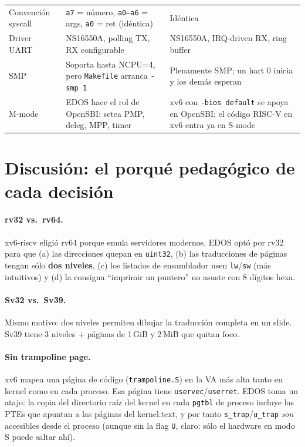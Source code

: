 \documentclass[11pt,a4paper]{article}
\begin{document}
\begin{center}
\begin{longtable}{@{}p{3.5cm}p{6cm}p{6cm}@{}}
Convención syscall   & \texttt{a7} = número, \texttt{a0--a6} = args, \texttt{a0} = ret (idéntica) & Idéntica \\
Driver UART          & NS16550A, polling TX, RX configurable & NS16550A, IRQ-driven RX, ring buffer \\
SMP                  & Soporta hasta NCPU=4, pero \texttt{Makefile} arranca \texttt{-smp 1} & Plenamente SMP; un hart 0 inicia y los demás esperan \\
M-mode               & EDOS hace el rol de OpenSBI: setea PMP, deleg, MPP, timer & xv6 con \texttt{-bios default} se apoya en OpenSBI; el código RISC-V en xv6 entra ya en S-mode \\
\bottomrule
\end{longtable}
\end{center}

\section{Discusión: el porqué pedagógico de cada decisión}

\paragraph{rv32 vs.\ rv64.}
xv6-riscv eligió rv64 porque emula servidores modernos. EDOS optó
por rv32 para que (a) las direcciones quepan en \texttt{uint32}, (b)
las traducciones de páginas tengan sólo \textbf{dos niveles}, (c)
los listados de ensamblador usen \texttt{lw}/\texttt{sw} (más
intuitivos) y (d) la consigna ``imprimir un puntero'' no asuste con
8 dígitos hexa.

\paragraph{Sv32 vs.\ Sv39.}
Mismo motivo: dos niveles permiten dibujar la traducción completa
en un slide. Sv39 tiene 3 niveles + páginas de 1\,GiB y 2\,MiB que
quitan foco.

\paragraph{Sin trampoline page.}
xv6 mapea una página de código (\texttt{trampoline.S}) en la VA más
alta tanto en kernel como en cada proceso. Esa página tiene
\texttt{uservec}/\texttt{userret}. EDOS toma un atajo: la copia del
directorio raíz del kernel en cada \texttt{pgtbl} de proceso
incluye las PTEs que apuntan a las páginas del kernel.text, y por
tanto \texttt{s\_trap}/\texttt{u\_trap} \emph{son} accesibles desde
el proceso (aunque sin la flag \texttt{U}, claro: sólo el hardware
en modo S puede saltar ahí).
\end{document}
